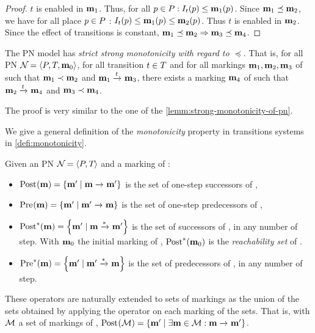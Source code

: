 \begin{proof}
  $t$ is enabled in $\mathbf{m}_1$.
	Thus, for all $p \in \places : \inw[t][p] \leq \mar_1(p)$.
	Since $\mathbf{m}_1 \preceq \mathbf{m}_2$, we have for all place $p \in P$ : $\inw[t][p] \leq \mar_1(p) \leq \mar_2(p)$.
	Thus $t$ is enabled in $\mathbf{m}_2$.
	Since the effect of transitions is constant, $\mathbf{m}_1 \preceq \mathbf{m}_2 \Rightarrow \mathbf{m}_3 \preceq \mathbf{m}_4$.
\end{proof}

\begin{lemm}
  The \ac{PN} model has \emph{strict strong monotonicity with regard to $\preceq$}.
	That is, for all \ac{PN} $\defPN$, for all transition $t \in T$ and for all markings $\mathbf{m}_1, \mathbf{m}_2, \mathbf{m}_3$ of \namePN such that $\mathbf{m}_1 \prec \mathbf{m}_2$ and $\mathbf{m}_1 \xrightarrow{t}_{} \mathbf{m}_3$, there exists a marking $\mathbf{m}_4$ of \namePN such that $\mathbf{m}_2 \xrightarrow{t}_{} \mathbf{m}_4$ and $\mathbf{m}_3 \prec \mathbf{m}_4$.
\end{lemm}

The proof is very similar to the one of the \cref{lemm:strong-monotonicity-of-pn}.

We give a general definition of the \emph{monotonicity} property in transitions systems in \cref{defi:monotonicity}.

\begin{defi}
  Given an \ac{PN} $\mathcal{N}_{} = \left\langle P_{}, T_{}\right\rangle$ and a marking \mar of \namePN:
  \begin{itemize}
    \item $\operatorname{Post}_{}(\mathbf{m}) = \left\{\mathbf{m}' \mid \mathbf{m} \xrightarrow{}_{} \mathbf{m}'\right\}$ is the set of one-step successors of \mar,
    \item $\operatorname{Pre}_{}(\mathbf{m}) = \left\{\mathbf{m}' \mid \mathbf{m}' \xrightarrow{}_{} \mathbf{m}\right\}$ is the set of one-step predecessors of \mar,
    \item $\operatorname{Post}^*_{{}}(\mathbf{m}) = \left\{\mathbf{m'} \mid \mathbf{m} \xrightarrow{*}_{} \mathbf{m'}\right\}$ is the set of successors of \mar, in any number of step.
      With $\mathbf{m}_0$ the initial marking of \namePN, $\operatorname{Post}^*_{{}}(\mathbf{m}_0)$ is the \emph{reachability set} of \namePN.%
    \item $\operatorname{Pre}^*_{}(\mathbf{m}) = \left\{\mathbf{m'} \mid \mathbf{m'} \xrightarrow{*}_{} \mathbf{m}\right\}$ is the set of predecessors of \mar, in any number of step.
  \end{itemize}
\end{defi}

These operators are naturally extended to sets of markings as the union of the sets obtained by applying the operator on each marking of the sets.
That is, with $\mathcal{M}$ a set of markings of \namePN,
$\operatorname{Post}_{}(\mathcal{M}) = \left\{\mathbf{m'} \mid \exists \mathbf{m} \in \mathcal{M} : \mathbf{m} \xrightarrow{}_{} \mathbf{m'}\right\}$.

